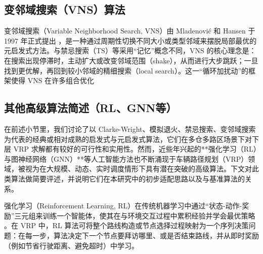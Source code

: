\documentclass[12pt,a4paper,twoside]{ctexbook}
\begin{document}
\subsection{变邻域搜索（VNS）算法}

变邻域搜索（Variable Neighborhood Search, VNS）由 Mladenović 和 Hansen 于 1997 年正式提出 \cite{mladenovic1997variable}，是一种通过周期性切换不同大小或类型邻域来摆脱局部最优的元启发式方法。与禁忌搜索（TS）等采用“记忆”概念不同，VNS 的核心理念是：在搜索出现停滞时，主动扩大或改变邻域范围（shake），从而进行大步跳跃；一旦找到更优解，再回到较小邻域的精细搜索（local search）。这一“循环加扰动”的框架使得 VNS 在许多组合优化

\subsection{其他高级算法简述（RL、GNN等）}

在前述小节里，我们讨论了以 Clarke-Wright、模拟退火、禁忌搜索、变邻域搜索为代表的经典或相对成熟的启发式与元启发式算法，它们在多仓多路区场景下对下层 VRP 求解都有较好的可行性和实用性。然而，近些年兴起的**强化学习（RL）与图神经网络（GNN）**等人工智能方法也不断涌现于车辆路径规划（VRP）领域，被视为在大规模、动态、实时调度情形下具有潜在突破的高级算法。下文对此类算法做简要评述，并说明它们在本研究中的初步适配思路以及与基准算法的关系。

强化学习（Reinforcement Learning, RL）在传统机器学习中通过“状态-动作-奖励”三元组来训练一个智能体，使其在与环境交互过程中累积经验并学会最优策略 \cite{rl_intro}。在 VRP 中，RL 算法可将整个路线构造或节点选择过程映射为一个序列决策问题：在每一步，算法决定下一个节点要拜访哪里、或是否结束路线，并从即时奖励（例如节省行驶距离、避免超时）中学习。
\end{document}
